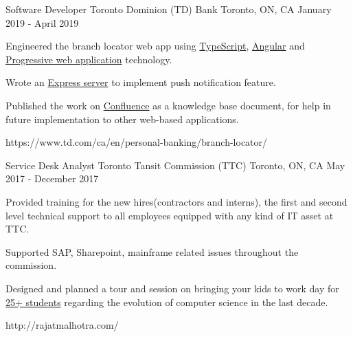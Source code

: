 
\begin{cventries}
\cventrylink
{Software Developer}
{Toronto Dominion (TD) Bank}
{ Toronto, ON, CA}
{January 2019 - April 2019}
{ %
\begin{cvitems}
\item{Engineered the branch locator web app using \underline{TypeScript},  \underline{Angular} and \underline{Progressive web application} technology.}
\item{Wrote an \underline{Express server} to implement push notification feature.}
\item{Published the work on \underline{Confluence} as a knowledge base document, for help in future implementation to other web-based applications.}
\end{cvitems}
}
{https://www.td.com/ca/en/personal-banking/branch-locator/}

\cventrylink
{Service Desk Analyst}
{Toronto Tansit Commission (TTC)}
{Toronto, ON, CA}
{May 2017 - December 2017}
{ %
\begin{cvitems}
\item{Provided training for the new hires(contractors and interns), the first and second level technical support to all employees equipped with any kind of IT asset at TTC.}
\item{Supported SAP, Sharepoint, mainframe related issues throughout the commission.}
\item{Designed and planned a tour and session on bringing your kids to work day for \underline{25+ students} regarding the evolution of computer science in the last decade.}
\end{cvitems}
}
{http://rajatmalhotra.com/}

\end{cventries}